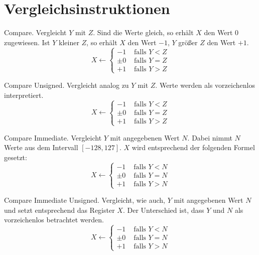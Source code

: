 \section{Vergleichsinstruktionen}

\glqq Compare\grqq.
Vergleicht $Y$ mit $Z$. Sind die Werte gleich, so erhält $X$ den Wert $0$
zugewiesen. Ist $Y$ kleiner $Z$, so erhält $X$ den Wert $-1$, $Y$ größer $Z$ den
Wert $+1$.
\[
    X \gets
    \begin{cases}
        -1 & \text{ falls } Y < Z  \\
     \pm 0 & \text{ falls } Y = Z  \\
        +1 & \text{ falls } Y > Z 
    \end{cases}
\]


\glqq Compare Unsigned\grqq.
Vergleicht analog zu  $Y$ mit $Z$.
Werte werden als vorzeichenlos interpretiert.
\[
    X \gets
    \begin{cases}
        -1 & \text{ falls } Y < Z  \\
     \pm 0 & \text{ falls } Y = Z  \\
        +1 & \text{ falls } Y > Z 
    \end{cases}
\]


\glqq Compare Immediate\grqq. 
Vergleicht $Y$ mit angegebenen Wert $N$. Dabei nimmt $N$ Werte aus dem Intervall
$[-128, 127]$. $X$ wird entsprechend der folgenden Formel gesetzt:
\[
    X \gets
    \begin{cases}
        -1 & \text{ falls } Y < N  \\
     \pm 0 & \text{ falls } Y = N  \\
        +1 & \text{ falls } Y > N 
    \end{cases}
\]


\glqq Compare Immediate Unsigned\grqq.
Vergleicht, wie  auch, $Y$ mit angegebenen Wert $N$ und setzt
entsprechend das Register $X$. Der Unterschied ist, dass $Y$ und $N$ als 
vorzeichenlos betrachtet werden.
\[
    X \gets
    \begin{cases}
       -1 & \text{ falls } Y < N  \\
     \pm0 & \text{ falls } Y = N  \\
       +1 & \text{ falls } Y > N 
    \end{cases}
\]

